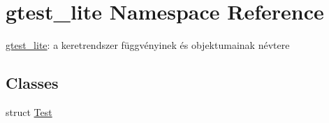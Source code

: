 \hypertarget{namespacegtest__lite}{}\section{gtest\+\_\+lite Namespace Reference}
\label{namespacegtest__lite}


\mbox{\hyperlink{namespacegtest__lite}{gtest\+\_\+lite}}\+: a keretrendszer függvényinek és objektumainak névtere  


\subsection*{Classes}
\begin{DoxyCompactItemize}
\item 
struct \mbox{\hyperlink{structgtest__lite_1_1_test}{Test}}
\end{DoxyCompactItemize}
